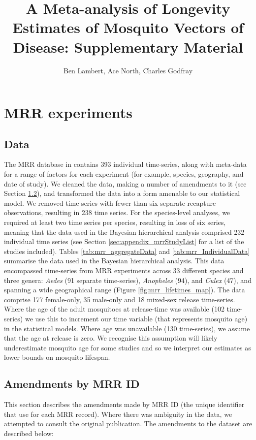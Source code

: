 \documentclass[12pt]{article}
\title{A Meta-analysis of Longevity Estimates of Mosquito Vectors of Disease: Supplementary Material}
\author{Ben Lambert, Ace North, Charles Godfray}
\begin{document}
\maketitle

\section{MRR experiments}
\subsection{Data}
The MRR database in \cite{guerra2014global} contains 393 individual time-series, along with meta-data for a range of factors for each experiment (for example, species, geography, and date of study). We  cleaned the data, making a number of amendments to it (see Section \ref{sec:amendments}), and transformed the data into a form amenable to our statistical model. We removed time-series with fewer than six separate recapture observations, resulting in 238 time series. For the species-level analyses, we required at least two time series per species, resulting in loss of six series, meaning that the data used in the Bayesian hierarchical analysis comprised 232 individual time series (see Section \ref{sec:appendix_mrrStudyList} for a list of the studies included). Tables \ref{tab:mrr_aggregateData} and \ref{tab:mrr_IndividualData} summarise the data used in the Bayesian hierarchical analysis. This data encompassed time-series from MRR experiments across 33 different species and three genera: \textit{Aedes} (91 separate time-series), \textit{Anopheles} (94), and \textit{Culex} (47), and spanning a wide geographical range (Figure \ref{fig:mrr_lifetimes_map}). The data comprise 177 female-only, 35 male-only and 18 mixed-sex release time-series. Where the age of the adult mosquitoes at release-time was available (102 time-series) we use this to increment our time variable (that represents mosquito age) in the statistical models. Where age was unavailable (130 time-series), we assume that the age at release is zero. We recognise this assumption will likely underestimate mosquito age for some studies and so we interpret our estimates as lower bounds on mosquito lifespan.

\subsection{Amendments by MRR ID}\label{sec:amendments}
This section describes the amendments made by MRR ID (the unique identifier that \cite{guerra2014global} use for each MRR record). Where there was ambiguity in the data, we attempted to consult the original publication. The amendments to the dataset are described below:
\end{document}
